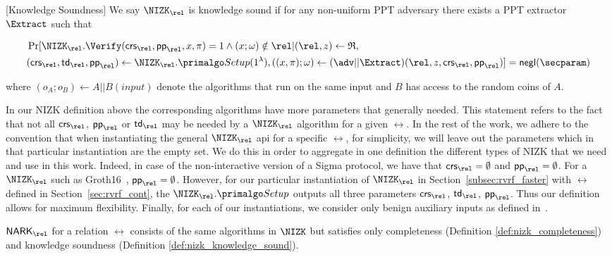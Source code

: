 \def\advP{\ensuremath{P^*}\xspace} %

\begin{definition}\label{def:nizk_knowledge_sound}[Knowledge Soundness]
	We say $\NIZK_\rel$ is {knowledge sound}  if %
	for any non-uniform PPT adversary \adv there exists a PPT extractor $ \Extract $
	such that
	\begin{footnotesize}
	\begin{align}
		&\Pr[\NIZK_\rel.\Verify(\crs_\rel, \pp_\rel, x,\pi) = 1 \wedge  (x;\omega) \notin \rel | (\rel,z) \leftarrow \mathfrak{R},   \nonumber \\
		&(\crs_\rel,\tw_\rel,  \pp_\rel) \leftarrow \NIZK_\rel.\Setup(1^{\lambda}), ((x,\pi);\omega)\leftarrow (\adv||\Extract)(\rel, z, \crs_\rel,  \pp_\rel)] =  \negl(\secparam) \nonumber
	\end{align}
\end{footnotesize}
	\noindent where $ (o_A;o_B)\leftarrow A||B(input) $ denote the algorithms that run on the same input and $ B $ has access to the random coins of $ A $.
\end{definition}

\noindent In our NIZK definition above the corresponding algorithms have more parameters that generally needed. 
This statement refers to the fact that not all $\crs_\rel$, $\pp_\rel$ or $\tw_\rel$ may be needed by a $\NIZK_\rel$ algorithm for a given $\rel$. 
In the rest of the work, we adhere to the convention that when instantiating the general $\NIZK_\rel$ api for a specific $\rel$, for simplicity, 
we will leave out the parameters which in that particular instantiation are the empty set. We do this in order to aggregate in one definition 
the different types of NIZK that we need and use in this work. Indeed, in case of the non-interactive version of a Sigma protocol, we have 
that $\crs_\rel = \emptyset$ and $\pp_\rel = \emptyset$. For a $\NIZK_\rel$ such as Groth16~\cite{Groth16}, $\pp_\rel  = \emptyset$. 
However, for our particular instantiation of $\NIZK_\rel$ in Section~\ref{subsec:rvrf_faster} with $\rel$ defined in Section~\ref{sec:rvrf_cont}, the $\NIZK_\rel.\Setup$ outputs 
all three parameters $\crs_\rel$, $\tw_\rel$, $\pp_\rel$. Thus our definition allows for maximum flexibility. Finally, for each of our instantiations, we consider only benign 
auxiliary inputs as defined in~\cite{bening_auxiliary}. 

\begin{definition} $ \NARK_\rel $ for a relation $ \rel $ consists of the same algorithms in $ \NIZK $ but satisfies only completeness (Definition \ref{def:nizk_completeness}) and knowledge soundness (Definition \ref{def:nizk_knowledge_sound}).
\end{definition}


